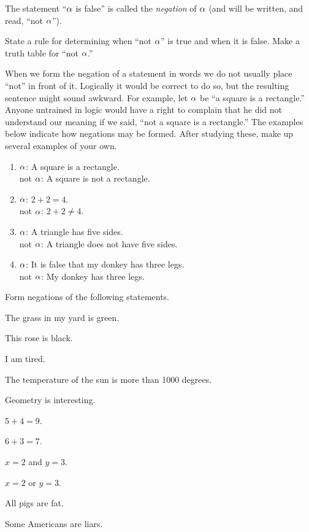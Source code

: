 \documentclass[11pt]{book}
\begin{document}
\begin{definition}
The statement ``$\alpha$ is false'' is called the \emph{negation} of $\alpha$ (and will
be written, and read, ``not $\alpha$'').
\end{definition}

\begin{IIproblem}
State a rule for determining when ``not $\alpha$'' is true and when
it is false. Make a truth table for ``not $\alpha$.''
\end{IIproblem}

When we form the negation of a statement in words we do not usually place ``not''
in front of it. Logically it would be correct to do so, but the resulting
sentence might sound awkward. For example, let $\alpha$ be ``a square is a
rectangle.'' Anyone untrained in logic would have a right to complain that he did
not understand our meaning if we said, ``not a square is a rectangle.'' The
examples below indicate how negations may be formed. After studying these, make
up several examples of your own.

\begin{enumerate}[label=(\alph*), leftmargin=2.6em, itemsep=3pt, topsep=3pt]
\item $\alpha$: A square is a rectangle.\\
      not $\alpha$: A square is not a rectangle.
\item $\alpha$: $2 + 2 = 4$.\\
      not $\alpha$: $2 + 2 \neq 4$.
\item $\alpha$: A triangle has five sides.\\
      not $\alpha$: A triangle does not have five sides.
\item $\alpha$: It is false that my donkey has three legs.\\
      not $\alpha$: My donkey has three legs.
\end{enumerate}


Form negations of the following statements.

\begin{exercisecols}
\begin{exlist}
\item The grass in my yard is green.
\item This rose is black.
\item I am tired.
\item The temperature of the sun is more than 1000 degrees.
\item Geometry is interesting.
\item $5 + 4 = 9$.
\item $6 + 3 = 7$.
\item[\stex 8.] $x = 2$ and $y = 3$.
\item[\stex 9.] $x = 2$ or $y = 3$.
\item[\stex 10.] All pigs are fat.
\item[\stex 11.] Some Americans are liars.
\end{exlist}
\end{exercisecols}
\IIstarnote{}
\end{document}
